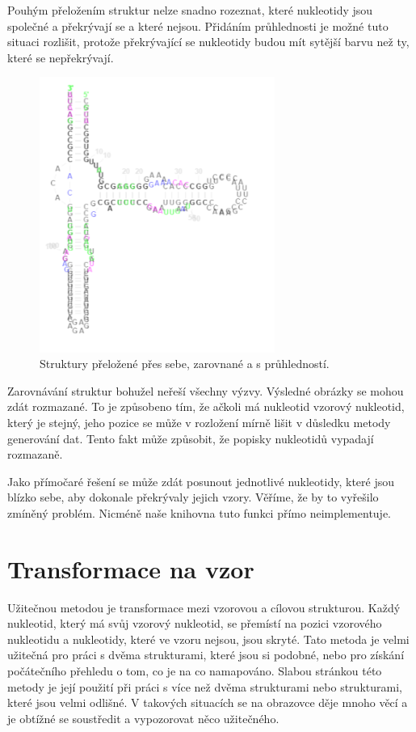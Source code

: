 Pouhým přeložením struktur nelze snadno rozeznat, které nukleotidy jsou
společné a překrývají se a které nejsou. Přidáním průhlednosti je možné tuto
situaci rozlišit, protože překrývající se nukleotidy budou mít sytější barvu
než ty, které se nepřekrývají.

\begin{figure}[H]
  \centering
  \includegraphics[height=90mm]{../img/kap02/align/aligned.png}
  \caption{Struktury přeložené přes sebe, zarovnané a s průhledností.}
\end{figure}

Zarovnávání struktur bohužel neřeší všechny výzvy. Výsledné obrázky se mohou
zdát rozmazané. To je způsobeno tím, že ačkoli má nukleotid vzorový nukleotid,
který je stejný, jeho pozice se může v rozložení mírně lišit v důsledku metody
generování dat. Tento fakt může způsobit, že popisky nukleotidů vypadají
rozmazaně.

Jako přímočaré řešení se může zdát posunout jednotlivé nukleotidy, které jsou
blízko sebe, aby dokonale překrývaly jejich vzory. Věříme, že by to vyřešilo
zmíněný problém. Nicméně naše knihovna tuto funkci přímo neimplementuje.

\section{Transformace na vzor}

Užitečnou metodou je transformace mezi vzorovou a cílovou strukturou. Každý
nukleotid, který má svůj vzorový nukleotid, se přemístí na pozici vzorového
nukleotidu a nukleotidy, které ve vzoru nejsou, jsou skryté. Tato metoda je
velmi užitečná pro práci s dvěma strukturami, které jsou si podobné, nebo pro
získání počátečního přehledu o tom, co je na co namapováno. Slabou stránkou
této metody je její použití při práci s více než dvěma strukturami nebo
strukturami, které jsou velmi odlišné. V takových situacích se na obrazovce
děje mnoho věcí a je obtížné se soustředit a vypozorovat něco užitečného.

